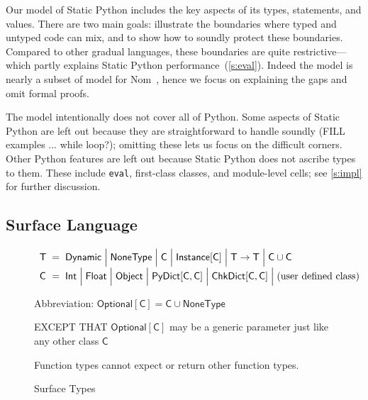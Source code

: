 \documentclass[english,cleveref,submission]{programming}
\makeatletter
\newcommand{\SP}{Static Python}
\newcommand{\code}[1]{\texttt{#1}}
\newcommand{\defeq}{=}
\newcommand{\langmid}{\mathrel{\mathbf{\Big\vert}}}
\newenvironment{langarray}{\(\def\arraystretch{1.5}\begin{array}{l@{\hspace{2mm}}c@{\hspace{2mm}}l}}{\end{array}\)}
\newcommand{\typefont}[1]{\mathsf{#1}}
\newcommand{\paramtype}[2]{#1[#2]}
\newcommand{\sptype}{\typefont{T}}
\newcommand{\sptclass}{\typefont{C}}
\newcommand{\sptint}{\typefont{Int}}
\newcommand{\sptfloat}{\typefont{Float}}
\newcommand{\sptdyn}{\typefont{Dynamic}}
\newcommand{\sptobject}{\typefont{Object}}
\newcommand{\sptnone}{\typefont{NoneType}}
\newcommand{\sptinstanceof}[1]{\paramtype{\typefont{Instance}}{#1}}
\newcommand{\sptfun}[2]{#1 \rightarrow #2}
\newcommand{\sptunion}[2]{#1 \cup #2}
\newcommand{\sptoptional}[1]{\paramtype{\typefont{Optional}}{#1}}
\newcommand{\sptrawpydict}{\typefont{PyDict}}
\newcommand{\sptpydict}[2]{\paramtype{\sptrawpydict}{#1, #2}}
\newcommand{\sptchkdict}[2]{\paramtype{\typefont{ChkDict}}{#1, #2}}
\makeatother
\begin{document}
Our model of \SP{} includes the key aspects of its types,
statements, and values.
There are two main goals:
illustrate the boundaries where typed and untyped code can mix,
and to show how to soundly protect these boundaries.
Compared to other gradual languages, these boundaries are quite restrictive---which
partly explains \SP{} performance~(\cref{s:eval}).
Indeed the model is nearly a subset of model for Nom~\cite{mt-oopsla-2021},
hence we focus on explaining the gaps and omit formal proofs.

The model intentionally does not cover all of Python.
Some aspects of \SP{} are left out because they are straightforward to
handle soundly (FILL examples ... while loop?);
omitting these lets us focus on the difficult corners.
Other Python features are left out because \SP{} does not ascribe types
to them.
These include \code{eval}, first-class classes, and module-level cells;
see \cref{s:impl} for further discussion.


\subsection{Surface Language}

\begin{figure}[t]
  \begin{langarray}
    \sptype & \defeq &
      \sptdyn \langmid
      \sptnone \langmid
      \sptclass \langmid
      \sptinstanceof{\sptclass} \langmid
      \sptfun{\sptype}{\sptype} \langmid
      \sptunion{\sptclass}{\sptclass}
  \\
    \sptclass & \defeq &
      \sptint \langmid
      \sptfloat \langmid
      \sptobject \langmid
      \sptpydict{\sptclass}{\sptclass} \langmid
      \sptchkdict{\sptclass}{\sptclass} \langmid
      \mbox{(user defined class)}
  \end{langarray}

  \begin{center}\parbox{0.8\columnwidth}{
    Abbreviation: $\sptoptional{\sptclass} \defeq \sptunion{\sptclass}{\sptnone}$

    EXCEPT THAT $\sptoptional{\sptclass}$ may be a generic parameter just like any other class $\sptclass$

    Function types cannot expect or return other function types.
  }\end{center}

  \caption{Surface Types}
  \label{f:surface-types}
\end{figure}
\end{document}
